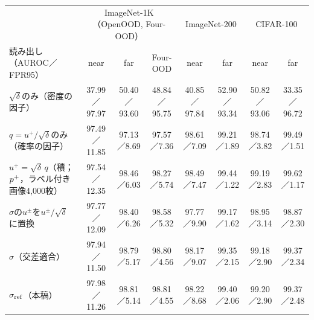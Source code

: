 {\fontsize{6.6pt}{7.8pt}\selectfont\renewcommand{\arraystretch}{1.0}%
\setlength{\tabcolsep}{1.9pt}\begin{tabular}{@{}lccccccc@{}}
\hline
\rule[-2.0pt]{0pt}{8.6pt} & \multicolumn{3}{c}{ImageNet-1K（OpenOOD, Four-OOD）} & \multicolumn{2}{c}{ImageNet-200} & \multicolumn{2}{c}{CIFAR-100} \\
\rule[-2.0pt]{0pt}{8.6pt}読み出し（AUROC／FPR95） & near & far & Four-OOD & near & far & near & far \\
\hline
$\sqrt{\delta}$のみ（密度の因子） & 37.99／97.97 & 50.40／93.60 & 48.84／95.75 & 40.85／97.84 & 52.90／93.34 & 50.82／93.06 & 33.35／96.72 \\
$q=u^{+}/\sqrt{\delta}$のみ（確率の因子） & 97.49／11.85 & 97.13／8.69 & 97.57／7.36 & 98.61／7.09 & 99.21／1.89 & 98.74／3.82 & 99.49／1.51 \\
$u^{+}=\sqrt{\delta}\,q$（積；$p^{+}$，ラベル付き画像4,000枚） & 97.54／12.35 & 98.46／6.03 & 98.27／5.74 & 98.49／7.47 & 99.44／1.22 & 99.19／2.83 & 99.62／1.17 \\
$\sigma$の$u^{\pm}$を$u^{\pm}/\sqrt{\delta}$に置換 & 97.77／12.09 & 98.40／6.26 & 98.58／5.32 & 97.77／9.90 & 99.17／1.62 & 98.95／3.14 & 98.87／2.30 \\
\hline
$\sigma$（交差適合） & 97.94／11.50 & 98.79／5.17 & 98.80／4.56 & 98.17／9.07 & 99.35／2.15 & 99.18／2.90 & 99.37／2.34 \\
$\sigma_{\mathrm{ref}}$（本稿） & 97.98／11.26 & 98.81／5.14 & 98.81／4.55 & 98.22／8.68 & 99.40／2.06 & 99.20／2.90 & 99.37／2.48 \\
\hline
\end{tabular}}%
